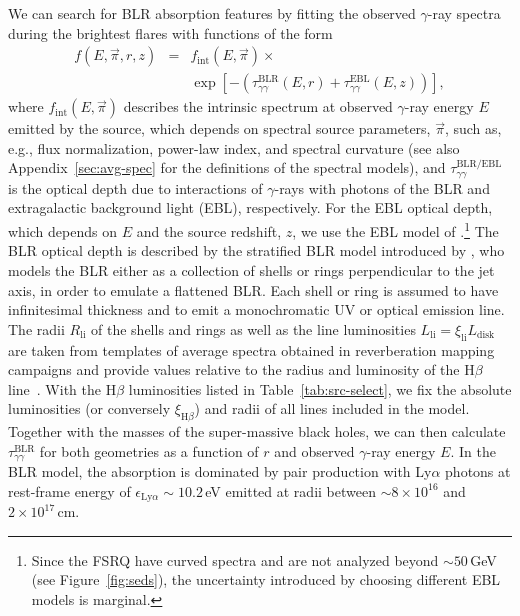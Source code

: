 \documentclass[twocolumn]{aastex62}
\newcommand{\Grays}{$\gamma$-rays\xspace}
\newcommand{\gray}{$\gamma$-ray\xspace}
\begin{document}
We can search for BLR absorption features by fitting the observed \gray spectra during the brightest flares with functions of the form 
\begin{eqnarray}
    f(E,\vec{\pi},r,z) &=& f_\mathrm{int}(E,\vec{\pi}) \times \nonumber \\ &{}& \exp\left[-\left(\tau_{\gamma\gamma}^\mathrm{BLR}(E,r) +\tau_{\gamma\gamma}^\mathrm{EBL}(E,z) \right)  \right],
\end{eqnarray} 
where $f_\mathrm{int}(E, \vec{\pi})$ describes the intrinsic spectrum at observed \gray energy $E$ emitted by the source, which depends on spectral 
source parameters, $\vec{\pi}$, such as, e.g.,  flux normalization, power-law index, and spectral curvature (see also Appendix~\ref{sec:avg-spec} for the definitions of the spectral models),
and $\tau_{\gamma\gamma}^\mathrm{BLR / EBL}$ is the optical depth due to interactions of \Grays with photons of the BLR and extragalactic background light (EBL), respectively. 
For the EBL optical depth, which depends on $E$ and the source redshift, $z$, we use the EBL model of \citet{2011MNRAS.410.2556D}.\footnote{
Since the FSRQ have curved spectra and are not analyzed beyond $\sim 50\,$GeV (see Figure~\ref{fig:seds}), the uncertainty introduced by choosing different EBL models is marginal.
}
The BLR optical depth is described by the stratified BLR model introduced by \citet{finke2016}, who models the BLR either as a collection of shells or rings perpendicular to the jet axis, in order to emulate a flattened BLR. 
Each shell or ring is assumed to have infinitesimal thickness and to emit a monochromatic UV or optical emission line. 
The radii $R_\mathrm{li}$ of the shells and rings as well as the line luminosities $L_\mathrm{li} = \xi_\mathrm{li}L_\mathrm{disk}$ are taken from templates of average spectra obtained in reverberation mapping campaigns and provide values relative to the radius and luminosity of the H$\beta$ line~\citep[see][for further details]{finke2016}.
With the H$\beta$ luminosities listed in Table~\ref{tab:src-select}, we fix the absolute luminosities (or conversely $\xi_{\mathrm{H}\beta}$) and radii of all lines included in the model.  
Together with the masses of the super-massive black holes, we can then calculate $\tau_{\gamma\gamma}^\mathrm{BLR}$ for both geometries as a function of $r$ and observed \gray energy $E$.
In the BLR model, the absorption is dominated by pair production with Ly$\alpha$ photons at rest-frame energy of $\epsilon_{\mathrm{Ly}\alpha}\sim10.2\,$eV emitted at radii between $\sim 8\times10^{16}$ and $2\times10^{17}$\,cm. 
\end{document}

